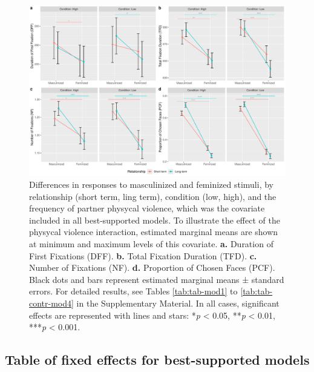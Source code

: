 \documentclass[
  bookmarksnumbered]{article}
\begin{document}
\begin{figure}
\centering
\includegraphics{Supplementary_material_files/figure-latex/unnamed-chunk-50-1.pdf}
\caption{\label{fig:unnamed-chunk-50}Differences in responses to masculinized and feminized stimuli, by relationship (short term, ling term), condition (low, high), and the frequency of partner physycal violence, which was the covariate included in all best-supported models. To illustrate the effect of the physycal violence interaction, estimated marginal means are shown at minimum and maximum levels of this covariate. \textbf{a.} Duration of First Fixations (DFF). \textbf{b.} Total Fixation Duration (TFD). \textbf{c.} Number of Fixations (NF). \textbf{d.} Proportion of Chosen Faces (PCF). Black dots and bars represent estimated marginal means ± standard errors. For detailed results, see Tables \ref{tab:tab-mod1} to \ref{tab:tab-contr-mod4} in the Supplementary Material. In all cases, significant effects are represented with lines and stars: *\emph{p} \textless{} 0.05, **\emph{p} \textless{} 0.01, ***\emph{p} \textless{} 0.001.}
\end{figure}

\subsection{Table of fixed effects for best-supported models}\label{table-of-fixed-effects-for-best-supported-models}
\end{document}
